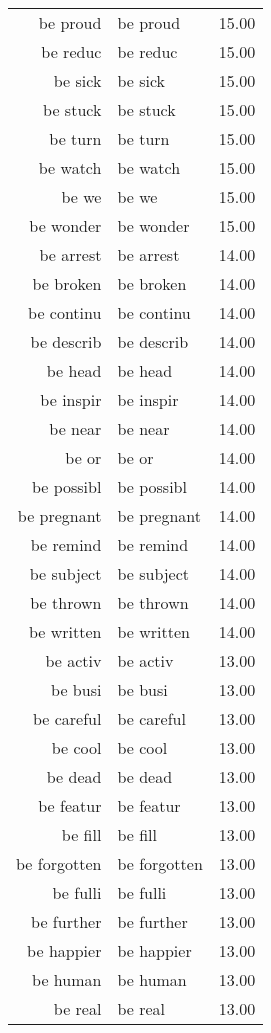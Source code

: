 \begin{table}[ht]
\begin{tabular}{rlr}
  be proud & be proud & 15.00 \\ 
  be reduc & be reduc & 15.00 \\ 
  be sick & be sick & 15.00 \\ 
  be stuck & be stuck & 15.00 \\ 
  be turn & be turn & 15.00 \\ 
  be watch & be watch & 15.00 \\ 
  be we & be we & 15.00 \\ 
  be wonder & be wonder & 15.00 \\ 
  be arrest & be arrest & 14.00 \\ 
  be broken & be broken & 14.00 \\ 
  be continu & be continu & 14.00 \\ 
  be describ & be describ & 14.00 \\ 
  be head & be head & 14.00 \\ 
  be inspir & be inspir & 14.00 \\ 
  be near & be near & 14.00 \\ 
  be or & be or & 14.00 \\ 
  be possibl & be possibl & 14.00 \\ 
  be pregnant & be pregnant & 14.00 \\ 
  be remind & be remind & 14.00 \\ 
  be subject & be subject & 14.00 \\ 
  be thrown & be thrown & 14.00 \\ 
  be written & be written & 14.00 \\ 
  be activ & be activ & 13.00 \\ 
  be busi & be busi & 13.00 \\ 
  be careful & be careful & 13.00 \\ 
  be cool & be cool & 13.00 \\ 
  be dead & be dead & 13.00 \\ 
  be featur & be featur & 13.00 \\ 
  be fill & be fill & 13.00 \\ 
  be forgotten & be forgotten & 13.00 \\ 
  be fulli & be fulli & 13.00 \\ 
  be further & be further & 13.00 \\ 
  be happier & be happier & 13.00 \\ 
  be human & be human & 13.00 \\ 
  be real & be real & 13.00 \\ 

\end{tabular}
\end{table}
